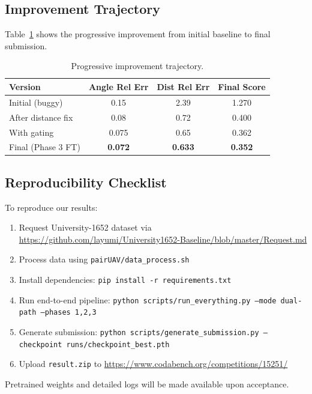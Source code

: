 \documentclass[sigconf,nonacm]{acmart}
\begin{document}
\subsection{Improvement Trajectory}

Table~\ref{tab:improvement} shows the progressive improvement from initial baseline to final submission.

\begin{table}[H]
\centering
\caption{Progressive improvement trajectory.}
\label{tab:improvement}
\begin{tabular}{lccc}
\toprule
Version & Angle Rel Err & Dist Rel Err & Final Score \\
\midrule
Initial (buggy) & 0.15 & 2.39 & 1.270 \\
After distance fix & 0.08 & 0.72 & 0.400 \\
With gating & 0.075 & 0.65 & 0.362 \\
Final (Phase 3 FT) & \textbf{0.072} & \textbf{0.633} & \textbf{0.352} \\
\bottomrule
\end{tabular}
\end{table}

\subsection{Reproducibility Checklist}

To reproduce our results:

\begin{enumerate}
    \item Request University-1652 dataset via \url{https://github.com/layumi/University1652-Baseline/blob/master/Request.md}
    \item Process data using \texttt{pairUAV/data\_process.sh}
    \item Install dependencies: \texttt{pip install -r requirements.txt}
    \item Run end-to-end pipeline: \texttt{python scripts/run\_everything.py --mode dual-path --phases 1,2,3}
    \item Generate submission: \texttt{python scripts/generate\_submission.py --checkpoint runs/checkpoint\_best.pth}
    \item Upload \texttt{result.zip} to \url{https://www.codabench.org/competitions/15251/}
\end{enumerate}

Pretrained weights and detailed logs will be made available upon acceptance.
\end{document}
